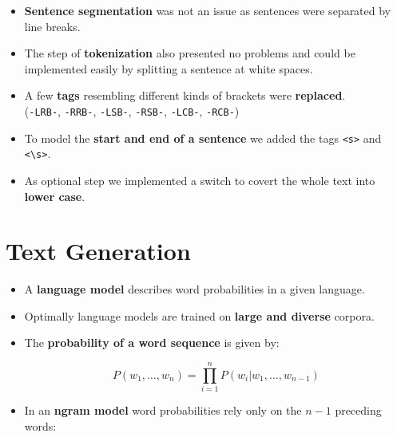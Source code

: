 \documentclass[a0,boxedsections,landscape]{sciposter}
\begin{document}
\begin{multicols}{3}
\begin{itemize}
    \item \textbf{Sentence segmentation} was not an issue as sentences were separated by line breaks.
    
    \item The step of \textbf{tokenization} also presented no problems and could be implemented easily by splitting a sentence at white spaces.
    
    \item A few \textbf{tags} resembling different kinds of brackets were \textbf{replaced}.\\
    {\small(\verb+-LRB-+, \verb+-RRB-+, \verb+-LSB-+, \verb+-RSB-+, \verb+-LCB-+, \verb+-RCB-+)}
    
    \item To model the \textbf{start and end of a sentence} we added the tags \verb+<s>+ and \verb+<\s>+.
    
    \item As optional step we implemented a switch to covert the whole text into \textbf{lower case}.
    
\end{itemize}


\section{Text Generation}

\begin{itemize}

    \item A \textbf{language model} describes word probabilities in a given language.

    \item Optimally language models are trained on \textbf{large and diverse} corpora.
    
    \item The \textbf{probability of a word sequence} is given by:
    
    \begin{equation}
        P(w_1, \dots, w_n) = \prod^n_{i=1}P(w_i|w_1, \dots, w_{n-1})
    \end{equation}
    
    \item In an \textbf{ngram model} word probabilities rely only on the $n-1$ preceding words:
    
    

\end{itemize}
\end{multicols}
\end{document}
